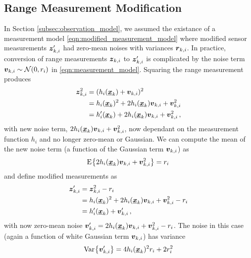 \documentclass[10pt,letterpaper,oneside,twocolumn,journal]{IEEEtran}
\theoremstyle{definition}
\theoremstyle{definition}
\theoremstyle{remark}
\begin{document}
\subsection{Range Measurement Modification} \label{subsec:range_measurement_mod}
In Section \ref{subsec:observation_model}, we assumed the existance of a measurement model \eqref{eqn:modified_measurement_model} where modified sensor measurements ${\boldsymbol{z}}'_{k,i}$ had zero-mean noises with variances ${\boldsymbol{r}}_{k,i}$. In practice, conversion of range measurements ${\boldsymbol{z}}_{k,i}$ to ${\boldsymbol{z}}'_{k,i}$ is complicated by the noise term ${\boldsymbol{v}}_{k,i} \sim \mathcal{N}(0, r_i)$ in \eqref{eqn:measurement_model}. Squaring the range measurement produces
\begin{equation}
    \begin{split}
        {\boldsymbol{z}}_{k,i}^2 &= (h_i({\boldsymbol{\underline{x}}}_k) + {\boldsymbol{v}}_{k,i})^2 \\
        &= h_i({\boldsymbol{\underline{x}}}_k)^2 + 2h_i({\boldsymbol{\underline{x}}}_k){\boldsymbol{v}}_{k,i} + {\boldsymbol{v}}_{k,i}^2 \\
        &= h'_i({\boldsymbol{\underline{x}}}_k) + 2h_i({\boldsymbol{\underline{x}}}_k){\boldsymbol{v}}_{k,i} + {\boldsymbol{v}}_{k,i}^2\,,
    \end{split}
\end{equation}
with new noise term, $2h_i({\boldsymbol{\underline{x}}}_k){\boldsymbol{v}}_{k,i} + {\boldsymbol{v}}_{k,i}^2$, now dependant on the measurement function $h_i$ and no longer zero-mean or Gaussian. We can compute the mean of the new noise term (a function of the Gaussian term ${\boldsymbol{v}}_{k,i}$) as
\begin{equation}
    \E{2h_i(\rvec{x}_k)\rv{v}_{k,i} + \rv{v}_{k,i}^2} = r_i\, \label{eqn:modified_noise_mean}
\end{equation}
and define modified measurements as
\begin{equation} \label{eqn:modified_measurement}
    \begin{split}
        \rv{z}'_{k,i} &= \rv{z}_{k,i}^2 - r_i \\
        &= h_i(\rvec{x}_k)^2 + 2h_i(\rvec{x}_k)\rv{v}_{k,i} + \rv{v}_{k,i}^2 - r_i \\
        &= h'_i(\rvec{x}_k) + \rv{v}'_{k,i}\,,
    \end{split}
\end{equation}
with now zero-mean noise ${\boldsymbol{v}}'_{k,i} = 2h_i({\boldsymbol{\underline{x}}}_k){\boldsymbol{v}}_{k,i} + {\boldsymbol{v}}_{k,i}^2 - r_i$. The noise in this case (again a function of white Gaussian term ${\boldsymbol{v}}_{k,i}$) has variance 
\begin{equation}
    \Var{\rv{v}'_{k,i}} = 4h_i(\rvec{x}_k)^2r_i + 2r_i^2
\end{equation}
\end{document}
